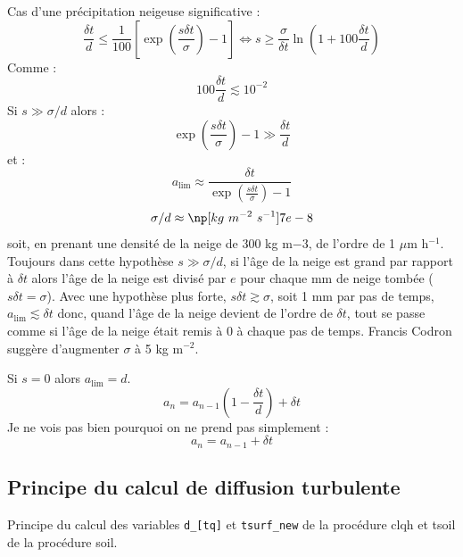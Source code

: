 \documentclass[a4paper,english,french]{article}
\begin{document}
Cas d'une précipitation neigeuse significative :
\begin{equation*}
  \frac{\delta t}{d}
  \le
  \frac{1}{100} \left[\exp \left(\frac{s \delta t}{\sigma} \right) - 1 \right]
  \Leftrightarrow
  s \ge \frac{\sigma}{\delta t} \ln \left(1 + 100 \frac{\delta t}{d} \right)
\end{equation*}
Comme :
\begin{equation*}
  100 \frac{\delta t}{d} \lesssim 10^{-2}
\end{equation*}
Si $s \gg \sigma / d$ alors :
\begin{equation*}
  \exp \left(\frac{s \delta t}{\sigma} \right) - 1 \gg \frac{\delta t}{d}
\end{equation*}
et :
\begin{equation*}
  a_\mathrm{lim}
  \approx \frac{\delta t}{\exp \left(\frac{s \delta t}{\sigma} \right) - 1}  
\end{equation*}
\begin{equation*}
  \sigma / d \approx \np[kg\ m^{-2}\ s^{-1}]{7e-8}
\end{equation*}
soit, en prenant une densité de la neige de 300 kg m${-3}$, de l'ordre
de 1 $\mu$m h$^{-1}$. Toujours dans cette hypothèse
$s \gg \sigma / d$, si l'âge de la neige est grand par rapport à
$\delta t$ alors l'âge de la neige est divisé par $e$ pour chaque mm
de neige tombée ($s \delta t = \sigma$). Avec une hypothèse plus
forte, $s \delta t \gtrsim \sigma$, soit 1 mm par pas de temps,
$a_\mathrm{lim} \lesssim \delta t$ donc, quand l'âge de la neige
devient de l'ordre de $\delta t$, tout se passe comme si l'âge de la
neige était remis à 0 à chaque pas de temps. Francis Codron suggère
d'augmenter $\sigma$ à 5 kg m$^{-2}$.

Si $s = 0$ alors $a_\mathrm{lim} = d$.
\begin{equation*}
  a_n = a_{n - 1} \left(1 - \frac{\delta t}{d} \right) + \delta t
\end{equation*}
Je ne vois pas bien pourquoi on ne prend pas simplement :
\begin{equation*}
    a_n = a_{n - 1} + \delta t
\end{equation*}

\subsection{Principe du calcul de diffusion turbulente}

Principe du calcul des variables \verb+d_[tq]+ et \verb+tsurf_new+ de
la procédure clqh et tsoil de la procédure soil.
\end{document}
